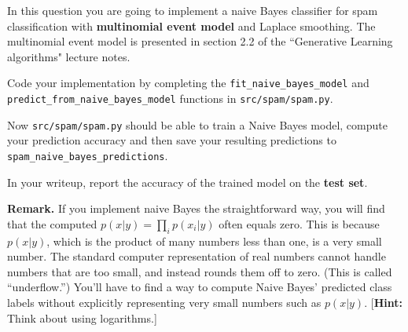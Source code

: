 \item {}
In this question you are going to implement a naive Bayes classifier for spam
classification with {\bf multinomial event model} and Laplace smoothing.
The multinomial event model is presented in section 2.2 of the ``Generative Learning algorithms" lecture notes.

Code your implementation by completing the \texttt{fit\_naive\_bayes\_model}
and \\\texttt{predict\_from\_naive\_bayes\_model} functions in
\texttt{src/spam/spam.py}.

Now \texttt{src/spam/spam.py} should be able to train a Naive Bayes model,
compute your prediction accuracy and then save your resulting predictions
to \texttt{spam\_naive\_bayes\_predictions}.

In your writeup, report the accuracy of the trained model on the \textbf{test set}.

{\bf Remark.} If you implement naive Bayes the straightforward way, you will find
that the computed $p(x|y) = \prod_i p(x_i | y)$ often equals zero.  This is
because $p(x|y)$, which is the product of many numbers less than one, is a very
small  number. The standard computer representation of real numbers cannot
handle numbers that are too small, and instead rounds them off to zero.  (This
is called  ``underflow.'')  You'll have to find a way to compute Naive Bayes'
predicted  class labels without explicitly representing very small numbers such
as $p(x|y)$.
[\textbf{Hint:} Think about using logarithms.]

